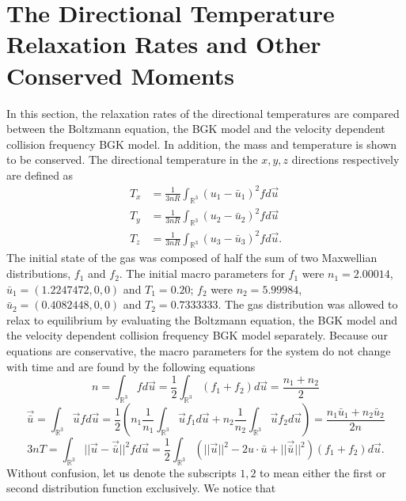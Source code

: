 \section{The Directional Temperature Relaxation Rates and Other Conserved Moments}
In this section, the relaxation rates of the directional temperatures are compared between the Boltzmann equation, the BGK model and the velocity dependent collision frequency BGK model. In addition, the mass and temperature is shown to be conserved. The directional temperature in the $x,y,z$ directions respectively are defined as
%
\begin{align*}
T_x &= \frac{1}{3 n R} \int_{\mathbb{R}^3} (u_1 - \bar{u}_1)^2 f d\vec{u}\\
T_y &= \frac{1}{3 n R} \int_{\mathbb{R}^3} (u_2 - \bar{u}_2)^2 f d\vec{u}\\
T_z &= \frac{1}{3 n R} \int_{\mathbb{R}^3} (u_3 - \bar{u}_3)^2 f d\vec{u}.
\end{align*}
%
The initial state of the gas was composed of half the sum of two Maxwellian distributions, $f_1$ and $f_2$. The initial macro parameters for $f_1$ were $n_1 = 2.00014$, $\bar{u}_1 = (1.2247472,0,0)$ and $T_1 = 0.20$; $f_2$ were $n_2 = 5.99984$, $\bar{u}_2 = (0.4082448,0,0)$ and $T_2 = 0.7333333$. The gas distribution was allowed to relax to equilibrium by evaluating the Boltzmann equation, the BGK model and the velocity dependent collision frequency BGK model separately. Because our equations are conservative, the macro parameters for the system do not change with time and are found by the following equations
%
\begin{equation}
\label{Total_den}
n = \int_{\mathbb{R}^3} f d\vec{u} = \frac{1}{2} \int_{\mathbb{R}^3} \left( f_1 + f_2 \right) d\vec{u} = \frac{n_1 + n_2}{2}
\end{equation}
%
\begin{equation}
\label{Total_mom}
\vec{\bar{u}} = \int_{\mathbb{R}^3} \vec{u} f d\vec{u} = \frac{1}{2} \left( n_1 \frac{1}{n_1} \int_{\mathbb{R}^3} \vec{u} f_1 d\vec{u} + n_2 \frac{1}{n_2} \int_{\mathbb{R}^3} \vec{u} f_2 d\vec{u} \right)  = \frac{n_1 \bar{u}_1 + n_2 \bar{u}_2}{2 n}
\end{equation}
%
\begin{equation}
\label{Total_temp_pre}
3 n T = \int_{\mathbb{R}^3} ||\vec{u}-\vec{\bar{u}}||^2 f d\vec{u} = \frac{1}{2} \int_{\mathbb{R}^3} \left( ||\vec{u}||^2-2 u \cdot \bar{u} + ||\vec{\bar{u}}||^2 \right) (f_1 + f_2) d\vec{u}.
\end{equation}
%
Without confusion, let us denote the subscripts $1,2$ to mean either the first or second distribution function exclusively. We notice that
